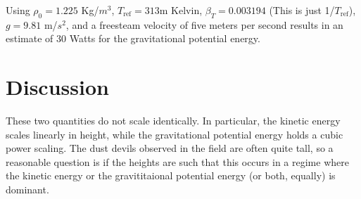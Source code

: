 \documentclass{article}
\begin{document}
Using $\rho_0 = 1.225$ Kg/$m^3$, $T_{\text{ref}}=313$m Kelvin, $\beta_T = 0.003194$
(This is just 1/$T_{\text{ref}}$), $g=9.81$ m/$s^2$, and a freesteam
velocity of five meters per second results in an
estimate of 30 Watts for the gravitational potential energy. 

\section*{Discussion}

These two quantities do not scale identically. In particular, 
the kinetic energy scales linearly in height, while the gravitational
potential energy holds a cubic power scaling. The dust devils observed
in the field are often quite tall, so a reasonable question is if the
heights are such that this occurs in a regime where the kinetic energy
or the gravititaional potential energy (or both, equally) is dominant.  

%
%

\end{document}
